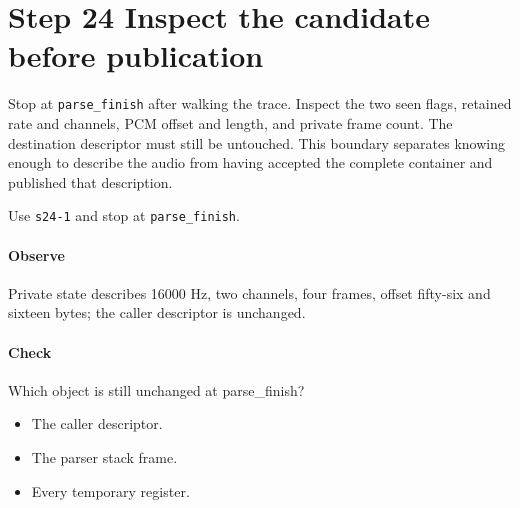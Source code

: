\section{Step 24 Inspect the candidate before publication}\label{pcm-wav-s24}
Stop at \texttt{parse\_finish} after walking the trace. Inspect the two seen flags, retained rate and channels, PCM offset and length, and private frame count. The destination descriptor must still be untouched. This boundary separates knowing enough to describe the audio from having accepted the complete container and published that description.

Use \texttt{s24-1} and stop at \texttt{parse\_finish}.

\paragraph{Observe} Private state describes 16000 Hz, two channels, four frames, offset fifty-six and sixteen bytes; the caller descriptor is unchanged.

\paragraph{Check} Which object is still unchanged at parse\_finish?
\begin{itemize}
  \item[A.] The caller descriptor.
  \item[B.] The parser stack frame.
  \item[C.] Every temporary register.
\end{itemize}
